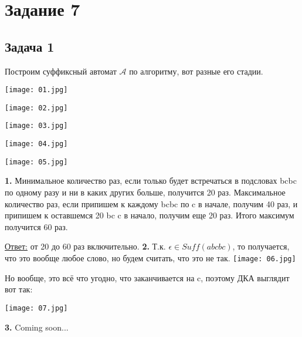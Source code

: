 \documentclass[a4paper,14pt]{article} %
\begin{document}

\section{Задание 7}
\subsection{Задача 1}
Построим суффиксный автомат $\mathcal{A}$ по алгоритму, вот разные его стадии.

\texttt{[image: 01.jpg]}

\texttt{[image: 02.jpg]}

\texttt{[image: 03.jpg]}

\texttt{[image: 04.jpg]}

\texttt{[image: 05.jpg]}

\textbf{1.} Минимальное количество раз, если только будет встречаться в подсловах bcbc по одному разу и ни в каких других больше, получится 20 раз.
Максимальное количество раз, если припишем к каждому bcbc по c в начале, получим 40 раз, и припишем к оставшемся 20 bc c в начало, получим еще 20 раз. Итого максимум получится 60 раз.

\underline{Ответ:} от 20 до 60 раз включительно.
\newline
\textbf{2.} Т.к. $\epsilon \in Suff(abcbc)$, то получается, что это вообще любое слово, но будем считать, что это не так.
\newline
\texttt{[image: 06.jpg]}

Но вообще, это всё что угодно, что заканчивается на c, поэтому ДКА выглядит вот так:

\texttt{[image: 07.jpg]}

\textbf{3.} Coming soon...
\end{document}
